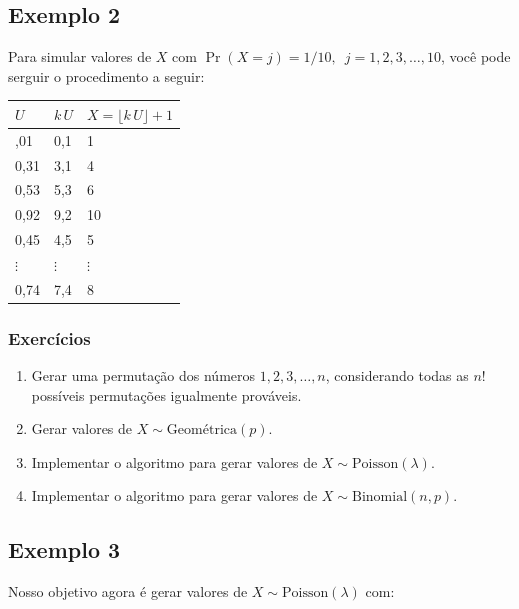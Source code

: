 \documentclass[
  letterpaper,
  DIV=11,
  numbers=noendperiod]{scrreprt}
\begin{document}
\subsection*{Exemplo 2}\label{exemplo-2}

Para simular valores de \(X\) com
\(\Pr(X=j)=1/10, \, \,\, j=1,2,3,\ldots, 10\), você pode serguir o
procedimento a seguir:

\begin{longtable}[]{@{}lll@{}}
\toprule\noalign{}
\(U\) & \(k\,U\) & {\(X=\lfloor k\,U \rfloor +1\)} \\
\midrule\noalign{}
\endhead
\bottomrule\noalign{}
\endlastfoot
0,01 & 0,1 & 1 \\
0,31 & 3,1 & 4 \\
0,53 & 5,3 & 6 \\
0,92 & 9,2 & 10 \\
0,45 & 4,5 & 5 \\
\(\vdots\) & \(\vdots\) & \(\vdots\) \\
0,74 & 7,4 & 8 \\
\end{longtable}

\subsubsection*{Exercícios}\label{exercuxedcios-7}

\begin{enumerate}
\def\labelenumi{\arabic{enumi}.}
\item
  Gerar uma permutação dos números \(1,2,3, \ldots, n\), considerando
  todas as \(n!\) possíveis permutações igualmente prováveis.
\item
  Gerar valores de \(X\sim \mbox{Geométrica}(p)\).
\item
  Implementar o algoritmo para gerar valores de
  \(X\sim \mbox{Poisson}(\lambda)\).
\item
  Implementar o algoritmo para gerar valores de
  \(X\sim \mbox{Binomial}(n,p)\).
\end{enumerate}

\subsection*{Exemplo 3}\label{exemplo-3}

Nosso objetivo agora é gerar valores de
\(X\sim \mbox{Poisson}(\lambda)\) com:
\end{document}
